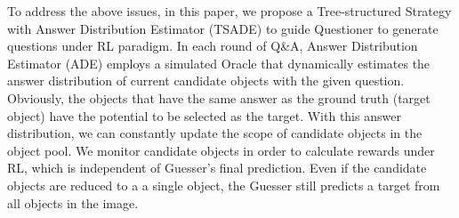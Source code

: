 



To address the above issues, in this paper, we propose a Tree-structured Strategy with Answer Distribution Estimator (TSADE) to guide Questioner to generate questions under RL paradigm.
In each round of Q\&A, Answer Distribution Estimator (ADE) employs a simulated Oracle that dynamically estimates the answer distribution of current candidate objects with the given question. Obviously, the objects that have the same answer as the ground truth (target object) have the potential to be selected as the target. With this answer distribution, we can constantly update the scope of candidate objects in the object pool.
We monitor candidate objects in order to calculate rewards under RL, which is independent of Guesser's final prediction. Even if the candidate objects are reduced to a a single object, the Guesser still predicts a target from all objects in the image.


